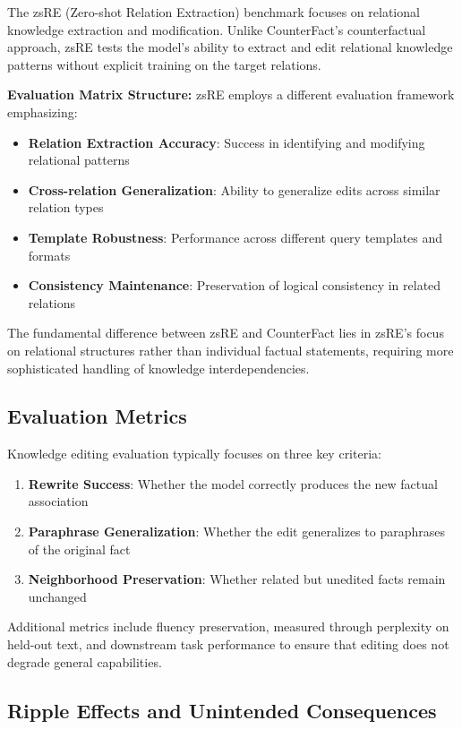 The zsRE (Zero-shot Relation Extraction) benchmark \cite{petroni_2019_language} focuses on relational knowledge extraction and modification. Unlike CounterFact's counterfactual approach, zsRE tests the model's ability to extract and edit relational knowledge patterns without explicit training on the target relations.

\textbf{Evaluation Matrix Structure:}
zsRE employs a different evaluation framework emphasizing:
\begin{itemize}
    \item \textbf{Relation Extraction Accuracy}: Success in identifying and modifying relational patterns
    \item \textbf{Cross-relation Generalization}: Ability to generalize edits across similar relation types
    \item \textbf{Template Robustness}: Performance across different query templates and formats
    \item \textbf{Consistency Maintenance}: Preservation of logical consistency in related relations
\end{itemize}

The fundamental difference between zsRE and CounterFact lies in zsRE's focus on relational structures rather than individual factual statements, requiring more sophisticated handling of knowledge interdependencies.


\subsection{Evaluation Metrics}

Knowledge editing evaluation typically focuses on three key criteria:

\begin{enumerate}
    \item \textbf{Rewrite Success}: Whether the model correctly produces the new factual association
    \item \textbf{Paraphrase Generalization}: Whether the edit generalizes to paraphrases of the original fact
    \item \textbf{Neighborhood Preservation}: Whether related but unedited facts remain unchanged
\end{enumerate}

Additional metrics include fluency preservation, measured through perplexity on held-out text, and downstream task performance to ensure that editing does not degrade general capabilities.

\subsection{Ripple Effects and Unintended Consequences}

